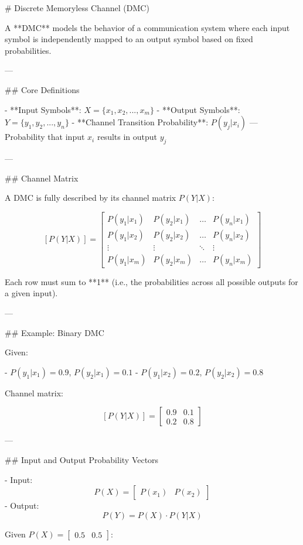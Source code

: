 
# Discrete Memoryless Channel (DMC)

A **DMC** models the behavior of a communication system where each input symbol is independently mapped to an output symbol based on fixed probabilities.

---

## Core Definitions

- **Input Symbols**: \( X = \{x_1, x_2, ..., x_m\} \)  
- **Output Symbols**: \( Y = \{y_1, y_2, ..., y_n\} \)
- **Channel Transition Probability**:  
  \( P(y_j|x_i) \) — Probability that input \( x_i \) results in output \( y_j \)

---

## Channel Matrix

A DMC is fully described by its channel matrix \( P(Y|X) \):

\[
[P(Y|X)] = \begin{bmatrix}
P(y_1|x_1) & P(y_2|x_1) & \dots & P(y_n|x_1) \\
P(y_1|x_2) & P(y_2|x_2) & \dots & P(y_n|x_2) \\
\vdots & \vdots & \ddots & \vdots \\
P(y_1|x_m) & P(y_2|x_m) & \dots & P(y_n|x_m)
\end{bmatrix}
\]

Each row must sum to **1** (i.e., the probabilities across all possible outputs for a given input).

---

## Example: Binary DMC

Given:

- \( P(y_1|x_1) = 0.9 \), \( P(y_2|x_1) = 0.1 \)
- \( P(y_1|x_2) = 0.2 \), \( P(y_2|x_2) = 0.8 \)

Channel matrix:

\[
[P(Y|X)] = \begin{bmatrix}
0.9 & 0.1 \\
0.2 & 0.8
\end{bmatrix}
\]

---

## Input and Output Probability Vectors

- Input:  
  \[
  P(X) = \begin{bmatrix} P(x_1) & P(x_2) \end{bmatrix}
  \]
- Output:  
  \[
  P(Y) = P(X) \cdot P(Y|X)
  \]

Given \( P(X) = \begin{bmatrix} 0.5 & 0.5 \end{bmatrix} \):

